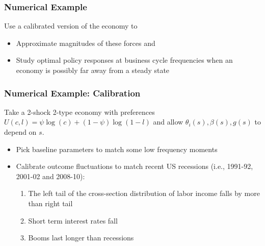 \documentclass{beamer}
\begin{document}
\begin{frame}
 \frametitle{Numerical Example}

 Use a  calibrated version of the economy to
 \begin{itemize}
  \item Approximate magnitudes of these forces and
  \item Study optimal policy responses at business cycle frequencies when an economy is possibly far away from a steady state
 \end{itemize}
 \end{frame}
 \begin{frame}
 \frametitle{Numerical Example: Calibration}
Take a 2-shock 2-type economy with preferences $U(c,l)=\psi \log(c)+(1-\psi)\log(1-l)$ and allow $\theta_i(s),\beta(s),g(s)$ to depend on $s$.

 \begin{itemize}

 \item Pick  baseline parameters to match some low frequency moments

 \item Calibrate outcome fluctuations to match recent US recessions (i.e., 1991-92, 2001-02 and 2008-10):

 \begin{enumerate}
  \item The left tail of the cross-section distribution of labor income falls by more than right tail
  \item Short term interest rates fall
  \item Booms last longer than recessions
 \end{enumerate}

 \end{itemize}

\end{frame}
\end{document}
